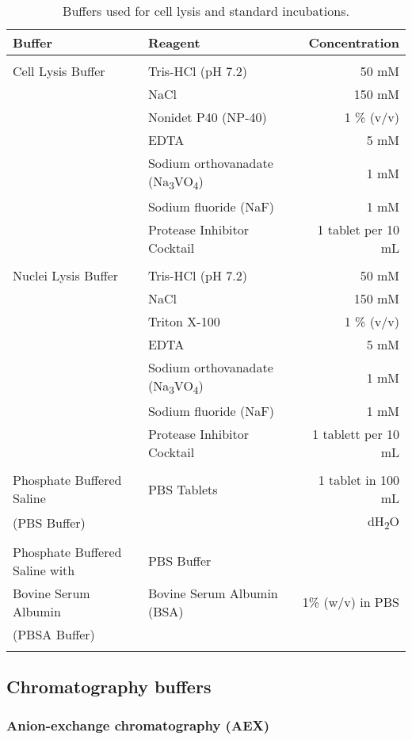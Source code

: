 \begin{table}[H]
\begin{tabular}{l l r}
\textbf{Buffer} & \textbf{Reagent} & \textbf{Concentration}\\
\hline
\\
Cell Lysis Buffer & Tris-HCl (pH 7.2) & 50 mM\\ & NaCl & 150 mM \\ & Nonidet P40 (NP-40) & 1 \% (v/v) \\ & EDTA & 5 mM\\ & Sodium orthovanadate (Na\textsubscript{3}VO\textsubscript{4}) & 1 mM\\ & Sodium fluoride (NaF) & 1 mM\\ & Protease Inhibitor Cocktail & 1 tablet per 10 mL \\  
\\
Nuclei Lysis Buffer & Tris-HCl (pH 7.2) & 50 mM\\ & NaCl & 150 mM\\ & Triton X-100 & 1 \% (v/v)\\ & EDTA & 5 mM\\ & Sodium orthovanadate (Na\textsubscript{3}VO\textsubscript{4}) & 1 mM\\ & Sodium fluoride (NaF) & 1 mM\\ & Protease Inhibitor Cocktail & 1 tablett per 10 mL\\
\\ 
Phosphate Buffered Saline & PBS Tablets & 1 tablet in 100 mL \\ 
(PBS Buffer) & & dH\textsubscript{2}O\\
\\
Phosphate Buffered Saline with & PBS Buffer & \\
Bovine Serum Albumin & Bovine Serum Albumin (BSA) & 1\% (w/v) in PBS \\
(PBSA Buffer) & & \\
\\

\end{tabular}

\caption[General buffers]{Buffers used for cell lysis and standard incubations.}
\label{General buffers}
\end{table}

\subsection{Chromatography buffers}
\subsubsection{Anion-exchange chromatography (AEX)}

